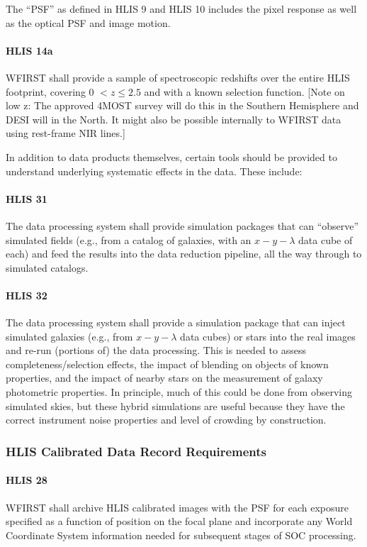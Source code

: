 The “PSF” as defined in HLIS 9 and HLIS 10 includes the pixel response as well
as the optical PSF and image motion.

\paragraph{HLIS 14a} WFIRST shall provide a sample of spectroscopic redshifts
over the entire HLIS footprint, covering 0 $< z \leq 2.5$ and with a known selection
function.  [Note on low z: The approved 4MOST survey will do this in the
Southern Hemisphere and DESI will in the North. It might also be possible
internally to WFIRST data using rest-frame NIR lines.]

In addition to data products themselves, certain tools should be provided to
understand underlying systematic effects in the data. These include:

\paragraph{HLIS 31} The data processing system shall provide simulation packages that can
“observe” simulated fields (e.g., from a catalog of galaxies, with an $x-y-\lambda$ data
cube of each) and feed the results into the data reduction pipeline, all the way
through to simulated catalogs.

\paragraph{HLIS 32} The data processing system shall provide a simulation package that can
inject simulated galaxies (e.g., from $x-y-\lambda$ data cubes) or stars into the real
images and re-run (portions of) the data processing. This is needed to assess
completeness/selection effects, the impact of blending on objects of known
properties, and the impact of nearby stars on the measurement of galaxy
photometric properties. In principle, much of this could be done from observing
simulated skies, but these hybrid simulations are useful because they have the
correct instrument noise properties and level of crowding by construction.

\subsubsection{HLIS Calibrated Data Record Requirements}

\paragraph{HLIS 28} WFIRST shall archive HLIS calibrated images with the PSF for each
exposure specified as a function of position on the focal plane and incorporate
any World Coordinate System information needed for subsequent stages of SOC
processing.

